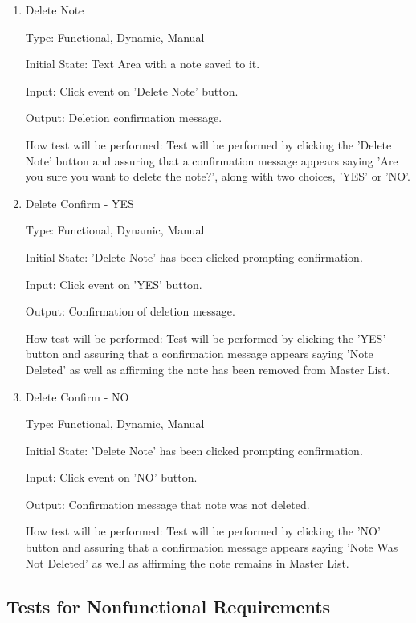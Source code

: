 \documentclass[12pt, titlepage]{article}
\begin{document}
\begin{enumerate}
	
	\item{Delete Note\\}
	
	Type: Functional, Dynamic, Manual
	
	Initial State: Text Area with a note saved to it. 
	
	Input: Click event on 'Delete Note' button.
	
	Output: Deletion confirmation message. 
	
	How test will be performed: Test will be performed by clicking the 'Delete Note' button 
	and assuring that a confirmation message appears saying 'Are you sure you want to 
	delete the note?', along with two choices, 'YES' or 'NO'.
	
	\item{Delete Confirm - YES\\}
	
	Type: Functional, Dynamic, Manual
	
	Initial State: 'Delete Note' has been clicked prompting confirmation. 

	Input: Click event on 'YES' button.
	
	Output: Confirmation of deletion message. 
	
	How test will be performed: Test will be performed by clicking the 'YES' button 
	and assuring that a confirmation message appears saying 'Note Deleted' as well as 
	affirming the note has been removed from Master List. 

	\item{Delete Confirm - NO\\}
	
	Type: Functional, Dynamic, Manual
	
	Initial State: 'Delete Note' has been clicked prompting confirmation. 
	
	Input: Click event on 'NO' button.
	
	Output: Confirmation message that note was not deleted. 
	
	How test will be performed: Test will be performed by clicking the 'NO' button 
	and assuring that a confirmation message appears saying 'Note Was Not Deleted' as 
	well as affirming the note remains in Master List. 	
	
\end{enumerate}

\subsection{Tests for Nonfunctional Requirements}
\end{document}
